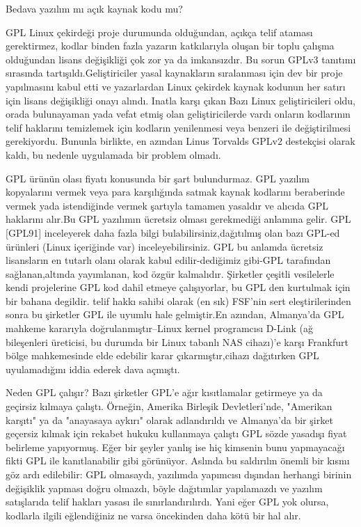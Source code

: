 \documentclass[10pt,a5paper]{book}
\begin{document}
\begin{section}{Bedava yazılım mı açık kaynak kodu mu?}
\begin{subsection}{GPL}
Linux çekirdeği proje durumunda olduğundan, açıkça telif ataması gerektirmez, kodlar binden fazla yazarın katkılarıyla oluşan bir toplu çalışma  olduğundan lisans değişikliği çok zor ya da imkansızdır. Bu sorun GPLv3 tanıtımı sırasında tartışıldı.Geliştiriciler yasal kaynakların sıralanması için dev bir proje yapılmasını kabul etti ve yazarlardan Linux çekirdek kaynak kodunun her satırı için lisans değişikliği onayı alındı. Inatla karşı çıkan Bazı Linux geliştiricileri oldu, orada bulunayaman yada vefat etmiş olan geliştiricilerde vardı onların kodlarının telif haklarını temizlemek için kodların yenilenmesi veya benzeri ile değiştirilmesi gerekiyordu. Bununla birlikte, en azından Linus Torvalds GPLv2  destekçisi olarak kaldı, bu nedenle uygulamada bir problem olmadı.

GPL ürünün olası fiyatı konusunda bir şart bulundurmaz. GPL yazılım kopyalarını vermek veya para karşılığında satmak kaynak kodlarını beraberinde vermek yada istendiğinde vermek şartıyla tamamen yasaldır ve alıcıda GPL haklarını alır.Bu GPL yazılımın ücretsiz olması gerekmediği anlamına gelir. GPL [GPL91] inceleyerek daha fazla bilgi bulabilirsiniz,dağıtılmış olan bazı  GPL-ed ürünleri (Linux içeriğinde var) inceleyebilirsiniz. GPL  bu anlamda ücretsiz lisansların en tutarlı olanı olarak kabul edilir-dediğimiz gibi-GPL tarafından sağlanan,altında yayımlanan, kod  özgür kalmalıdır. Şirketler çeşitli vesilelerle kendi projelerine GPL kod dahil etmeye çalışıyorlar, bu GPL den kurtulmak için bir bahana degildir. telif hakkı sahibi olarak (en sık) FSF'nin sert eleştirilerinden sonra bu şirketler GPL ile uyumlu hale gelmiştir.En azından, Almanya'da GPL mahkeme kararıyla doğrulanmıştır--Linux kernel programcısı D-Link (ağ bileşenleri üreticisi, bu durumda bir Linux tabanlı NAS cihazı)'e karşı Frankfurt bölge mahkemesinde elde edebilir karar çıkarmıştır,cihazı dağıtırken GPL uyulamadığını iddia ederek dava açmıştı.

Neden GPL çalışır? Bazı şirketler GPL'e ağır kısıtlamalar getirmeye ya da geçirsiz kılmaya çalıştı. Örneğin, Amerika Birleşik Devletleri'nde, "Amerikan karşıtı" ya da "anayasaya aykırı" olarak adlandırıldı ve Almanya'da bir şirket geçersiz kılmak için rekabet hukuku kullanmaya çalıştı GPL sözde yasadışı fiyat belirleme yapıyormuş. Eğer bir şeyler yanlış ise hiç kimsenin bunu yapmayacağı fikti GPL ile kanıtlanabilir gibi görünüyor. Aslında bu saldırılın önemli bir kısmı göz ardı edilebilir: GPL olmasaydı, yazılımda yapımcısı dışından herhangi birinin değişiklik yapması doğru olmazdı, böyle dağıtımlar yapılamazdı ve yazılım satışlarıda telif hakları yasası ile sınırlandırılırdı. Yani eğer GPL yok olursa, kodlarla ilgili eğlendiğiniz ne varsa öncekinden daha kötü bir hal alır.


\end{subsection}
\end{section}
\end{document}

